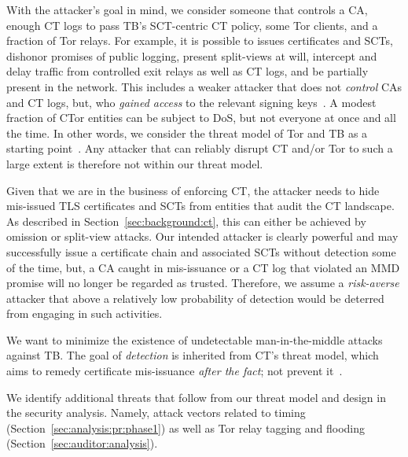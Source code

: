 With
the attacker's goal in mind, we consider someone that controls
	a CA,
	enough CT logs to pass TB's SCT-centric CT policy, 
	some Tor clients, and
	a fraction of Tor relays.
For example, it is possible to
	issues certificates and SCTs,
	dishonor promises of public logging,
	present split-views at will,
	intercept and delay traffic from controlled exit relays as well as CT logs,
		and
	be partially present in the network.
This includes a weaker attacker that does not \emph{control} CAs and CT logs,
but, who \emph{gained access} to the relevant signing keys~\cite{turktrust,%
gdca1-omission}.  A modest fraction of CTor entities can be subject to DoS, but
not everyone at once and all the time.  In other words, we consider the threat
model of Tor and TB as a starting point~\cite{tor,tor-browser}.  Any
attacker that can reliably disrupt CT and/or Tor to such a large extent is
therefore not within our threat model.

%
%
Given that we are in the business of enforcing CT, the attacker needs to hide
mis-issued TLS certificates and SCTs from entities that audit the CT landscape.
As described in Section~\ref{sec:background:ct}, this can either be achieved by
omission or split-view attacks.  Our intended attacker is clearly powerful and may
successfully issue a certificate chain and associated SCTs without detection
some of the time, but, a CA caught in mis-issuance or a CT log that violated an
MMD promise will no longer be regarded as trusted.  Therefore, we assume a
\emph{risk-averse} attacker that above a relatively low probability of detection
would be deterred from engaging in such activities.

%
%
We want to minimize the existence of undetectable man-in-the-middle attacks
against TB.  The goal of \emph{detection} is inherited from CT's threat
model, which aims to remedy certificate mis-issuance \emph{after the fact}; not
prevent it~\cite{ct/a}.

%
%
We identify additional threats that follow from our threat model and design
in the security analysis.  Namely, attack vectors related to
	timing (Section~\ref{sec:analysis:pr:phase1}) as well as
	Tor relay tagging and flooding (Section~\ref{sec:auditor:analysis}).
